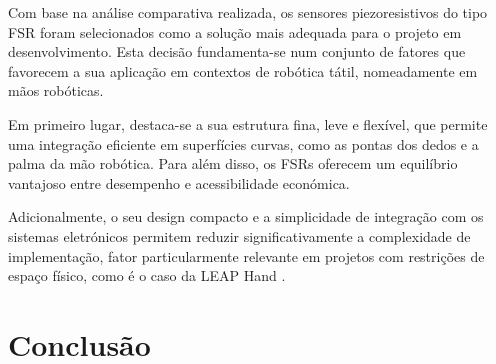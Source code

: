 \begin{table}[H]
    \centering
    \caption{Comparação entre diferentes tipos de sensores táteis}
    \label{tab:comparacao_sensores}
\end{table}

Com base na análise comparativa realizada, os sensores piezoresistivos do tipo \ac{FSR} foram selecionados como a solução mais adequada para o projeto em desenvolvimento. Esta decisão fundamenta-se num conjunto de fatores que favorecem a sua aplicação em contextos de robótica tátil, nomeadamente em mãos robóticas.

Em primeiro lugar, destaca-se a sua estrutura fina, leve e flexível, que permite uma integração eficiente em superfícies curvas, como as pontas dos dedos e a palma da mão robótica. Para além disso, os \acp{FSR} oferecem um equilíbrio vantajoso entre desempenho e acessibilidade económica.

Adicionalmente, o seu design compacto e a simplicidade de integração com os sistemas eletrónicos permitem reduzir significativamente a complexidade de implementação, fator particularmente relevante em projetos com restrições de espaço físico, como é o caso da LEAP Hand \cite{shaw2023leaphand}.



\section{Conclusão}

